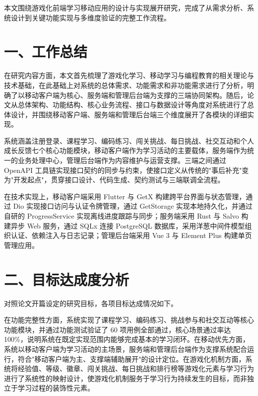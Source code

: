 
\begin{conclusion}
本文围绕游戏化前端学习移动应用的设计与实现展开研究，完成了从需求分析、系统设计到关键功能实现与多维度验证的完整工作流程。

\section*{一、工作总结}

在研究内容方面，本文首先梳理了游戏化学习、移动学习与编程教育的相关理论与技术基础，在此基础上对系统的总体需求、功能需求和非功能需求进行了分析，明确了以移动客户端为核心、服务端和管理后台端为支撑的三端协同架构。随后，论文从总体架构、功能结构、核心业务流程、接口与数据设计等角度对系统进行了总体设计，并围绕移动客户端、服务端和管理后台端三个维度展开了各模块的详细实现。

系统涵盖注册登录、课程学习、编码练习、闯关挑战、每日挑战、社交互动和个人成长反馈七个核心功能模块，移动客户端作为学习活动的主要载体，服务端作为统一的业务处理中心，管理后台端作为内容维护与运营支撑。三端之间通过 OpenAPI 工具链实现接口契约的同步与约束，使接口定义从传统的"事后补充"变为"开发起点"，贯穿接口设计、代码生成、契约测试与三端联调全流程。

在技术实现上，移动客户端采用 Flutter 与 GetX 构建跨平台界面与状态管理，通过 Dio 实现接口访问与认证令牌管理，通过 GetStorage 实现本地持久化，并通过自研的 ProgressService 实现离线进度跟踪与同步；服务端采用 Rust 与 Salvo 构建异步 Web 服务，通过 SQLx 连接 PostgreSQL 数据库，采用洋葱中间件模型组织认证、依赖注入与日志记录；管理后台端采用 Vue 3 与 Element Plus 构建单页管理应用。

\section*{二、目标达成度分析}

对照论文开篇设定的研究目标，各项目标达成情况如下。

在功能完整性方面，系统实现了课程学习、编码练习、挑战参与和社交互动等核心功能模块，并通过功能测试验证了 60 项用例全部通过，核心场景通过率达 100\%，说明系统在既定实现范围内能够完成基本的学习闭环。在移动优先方面，系统以移动客户端为学习活动的主场景，服务端和管理后台端作为支撑系统配合运行，符合"移动客户端为主、支撑端辅助展开"的设计定位。在游戏化机制方面，系统将经验值、等级、徽章、闯关挑战、每日挑战和排行榜等游戏化元素与学习行为进行了系统性的映射设计，使游戏化机制服务于学习行为持续发生的目标，而非独立于学习过程的装饰性元素。


\end{conclusion}
